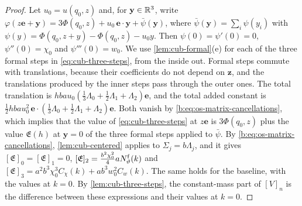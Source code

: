 \begin{proof}
Let $u_0=u(q_0,z)$ and, for $\mathbf y\in\mathbb R^3$, write
$\varphi(z\mathbf e+\mathbf y)=3\Phi(q_0,z)+u_0\,\mathbf e\cdot\mathbf y+\bar\psi(\mathbf y)$,
where $\bar\psi(\mathbf y)=\sum_i\psi(y_i)$ with
$\psi(y)=\Phi(q_0,z+y)-\Phi(q_0,z)-u_0y$. Then $\psi(0)=\psi'(0)=0$,
$\psi''(0)=\chi_0$ and $\psi'''(0)=w_0$. We use \cref{lem:cub-formal}(e) for
each of the three formal steps in \eqref{eq:cub-three-steps}, from the inside
out. Formal steps commute with translations, because their coefficients do not
depend on $\mathbf z$, and the translations produced by the inner steps pass
through the outer ones. The total translation is
$hbau_0(\frac13\Lambda_0+\frac12\Lambda_1+\Lambda_2)\mathbf e$, and the total
added constant is
$\frac12hbau_0^2\,\mathbf e\cdot(\frac13\Lambda_0+\frac12\Lambda_1+\Lambda_2)\mathbf
e$. Both vanish by \eqref{b:eq:os-matrix-cancellations}, which implies that the
value of \eqref{eq:cub-three-steps} at $z\mathbf e$ is $3\Phi(q_0,z)$ plus the value
$\mathfrak E(h)$ at $\mathbf y=0$ of the three formal steps applied to $\bar\psi$. By
\eqref{b:eq:os-matrix-cancellations}, \cref{lem:cub-centered} applies to
$\Sigma_j=b\Lambda_j$, and it gives $[\mathfrak E]_0=[\mathfrak E]_1=0$,
$[\mathfrak E]_2=\frac{b^2\chi_0^2}4aN^{\rm f}_\vartheta(k)$ and
$[\mathfrak E]_3=a^2b^3\chi_0^3C_\chi(k)+ab^3w_0^2C_w(k)$. The same holds for the
baseline, with the values at $k=0$. By \cref{lem:cub-three-steps}, the
constant-mass part of $[V]_n$ is the difference between these
expressions and their values at $k=0$.


\end{proof}
